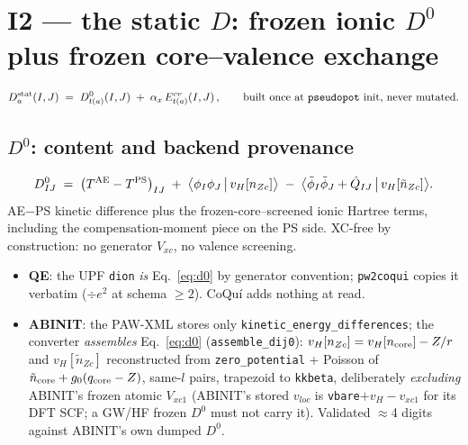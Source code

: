 \documentclass[11pt]{article}
\newcommand{\code}[1]{\texttt{#1}}
\newcommand{\Dstat}{D^{\rm stat}}
\newcommand{\Qhat}{\hat{Q}}
\newcommand{\phit}{\tilde\phi}
\begin{document}
\section{I2 --- the static $D$: frozen ionic $D^0$ plus frozen core--valence
exchange}
\label{sec:static}

\begin{keybox}
\begin{equation}
\Dstat_{a}(I,J) \;=\; D^{0}_{t(a)}(I,J)
\;+\; \alpha_x\, E^{cv}_{t(a)}(I,J)\,,
\qquad \text{built once at \code{pseudopot} init, never mutated.}
\label{eq:dstatic}
\end{equation}
\end{keybox}

\subsection{$D^0$: content and backend provenance}
\begin{equation}
D^{0}_{IJ} \;=\; \big(T^{\rm AE} - T^{\rm PS}\big)_{IJ}
\;+\; \big\langle \phi_I\phi_J \,\big|\, v_H[n_{Zc}] \big\rangle
\;-\; \big\langle \phit_I\phit_J + \Qhat_{IJ} \,\big|\, v_H[\tilde n_{Zc}]
\big\rangle .
\label{eq:d0}
\end{equation}
AE$-$PS kinetic difference plus the frozen-core--screened ionic Hartree
terms, including the compensation-moment piece on the PS side. XC-free by
construction: no generator $V_{xc}$, no valence screening.
\begin{itemize}[leftmargin=1.6em]
\item \textbf{QE}: the UPF \code{dion} \emph{is} Eq.~\eqref{eq:d0} by
generator convention; \code{pw2coqui} copies it verbatim ($\div e^2$ at
schema $\ge 2$). CoQu\'i adds nothing at read.
\item \textbf{ABINIT}: the PAW-XML stores only
\code{kinetic\_energy\_differences}; the converter \emph{assembles}
Eq.~\eqref{eq:d0} (\code{assemble\_dij0}): $v_H[n_{Zc}] = v_H[n_{\rm core}]
- Z/r$ and $v_H[\tilde n_{Zc}]$ reconstructed from
\code{zero\_potential} + Poisson of $\tilde n_{\rm core} + g_0(q_{\rm core}
- Z)$, same-$l$ pairs, trapezoid to \code{kkbeta}, deliberately
\emph{excluding} ABINIT's frozen atomic $V_{xc1}$ (ABINIT's stored
$v_{loc}$ is \code{vbare}$+v_H-v_{xc1}$ for its DFT SCF; a GW/HF frozen
$D^0$ must not carry it). Validated $\approx$4 digits against ABINIT's own
dumped $D^0$.
\end{itemize}
\end{document}
